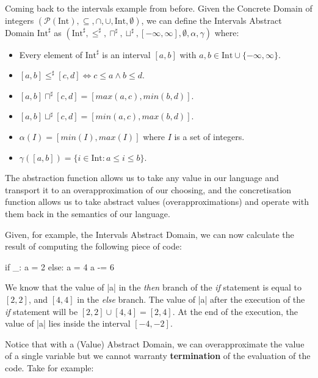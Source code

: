 Coming back to the intervals example from before. Given the Concrete
Domain of integers
\((\mathcal{P}(\text{Int}), \subseteq, \cap, \cup, \text{Int}, \emptyset)\), we can
define the Intervals Abstract Domain \(\text{Int}^{\sharp}\) as
\((\text{Int}^{\sharp}, \le^{\sharp}, \sqcap^{\sharp}, \sqcup^{\sharp}, [-\infty,\infty], \emptyset, \alpha, \gamma)\)
where:

\begin{itemize}
\tightlist
\item Every element of \(\text{Int}^{\sharp}\) is an interval \([a, b]\) with
  \(a, b \in \text{Int} \cup \{-\infty,\infty\}\).
\item \([a, b] \le^{\sharp} [c, d] \iff c \le a \wedge b \le d\).
\item \([a, b] \sqcap^{\sharp} [c, d] = [max(a,c), min(b, d)]\).
\item \([a, b] \sqcup^{\sharp} [c, d] = [min(a,c), max(b, d)]\).
\item \(\alpha(I) = [min(I), max(I)]\) where \(I\) is a set of integers.
\item \(\gamma([a, b]) = \{i \in \text{Int} : a \le i \le b\}\).
\end{itemize}

The abstraction function allows us to take any value
in our language and transport it to an overapproximation of our
choosing, and the concretisation function allows us to take abstract
values (overapproximations) and operate with them back in the semantics
of our language.

Given, for example, the Intervals Abstract Domain, we can now calculate
the result of computing the following piece of code:

\begin{pythoncode}
if _:
  a = 2
else:
  a = 4
a -= 6
\end{pythoncode}

We know that the value of \pycode|a| in the \emph{then} branch of the \emph{if} statement
is equal to \([2,2]\), and \([4,4]\) in the \emph{else} branch. The value of \pycode|a|
after the execution of the \emph{if} statement will be \([2,2] \cup [4,4] = [2,4]\). At
the end of the execution, the value of \pycode|a| lies inside the interval \([-4,-2]\).

Notice that with a (Value) Abstract Domain, we can overapproximate the
value of a single variable but we cannot warranty \textbf{termination}
of the evaluation of the code. Take for example:

